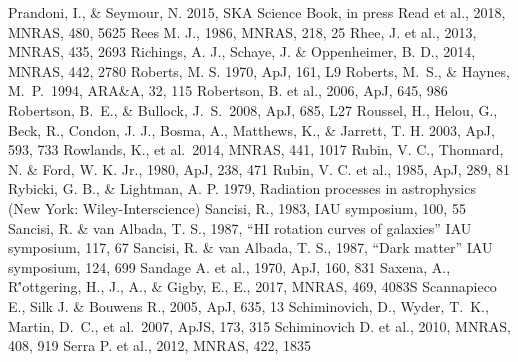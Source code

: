 \begin{thebibliography}{99}
\begin{multicols}{2}
{    	Prandoni, I., \& Seymour, N. 2015, SKA Science Book, in press
	Read et al., 2018, MNRAS, 480, 5625
	Rees M. J., 1986, MNRAS, 218, 25
	Rhee, J. et al., 2013, MNRAS, 435, 2693
	Richings, A. J., Schaye, J. \& Oppenheimer, B. D., 2014, MNRAS, 442, 2780
    	Roberts, M. S. 1970, ApJ, 161, L9
	Roberts, M.~S., \& Haynes, M.~P.\ 1994, ARA\&A, 32, 115 
    	Robertson, B. et al., 2006, ApJ, 645, 986
	Robertson, B.~E., \& Bullock, J.~S.\ 2008, ApJ, 685, L27 
    	Roussel, H., Helou, G., Beck, R., Condon, J. J., Bosma, A.,
    	Matthews, K., \& Jarrett, T. H. 2003, ApJ, 593, 733
    	Rowlands, K., et al.\ 2014, MNRAS, 441, 1017
	Rubin, V. C., Thonnard, N. \& Ford, W. K. Jr., 1980, ApJ, 238, 471
	Rubin, V. C. et al., 1985, ApJ, 289, 81
	Rybicki, G. B., \& Lightman, A. P. 1979, Radiation processes in astrophysics (New York: Wiley-Interscience)
	Sancisi, R., 1983, IAU symposium, 100, 55
	Sancisi, R. \& van Albada, T. S., 1987, ``HI rotation curves of galaxies'' IAU symposium, 117, 67
	Sancisi, R. \& van Albada, T. S., 1987, ``Dark matter'' IAU symposium, 124, 699
	Sandage A. et al., 1970, ApJ, 160, 831
	Saxena, A., R\''{o}ttgering, H., J., A., \& Gigby, E., E., 2017, MNRAS, 469, 4083S
	Scannapieco E., Silk J. \& Bouwens R., 2005, ApJ, 635, 13
	Schiminovich, D., Wyder, T.~K., Martin, D.~C., et al.\ 2007, ApJS, 173, 315 
	Schiminovich D. et al., 2010, MNRAS, 408, 919
	Serra P. et al., 2012, MNRAS, 422, 1835
}
\end{multicols}
\end{thebibliography}
